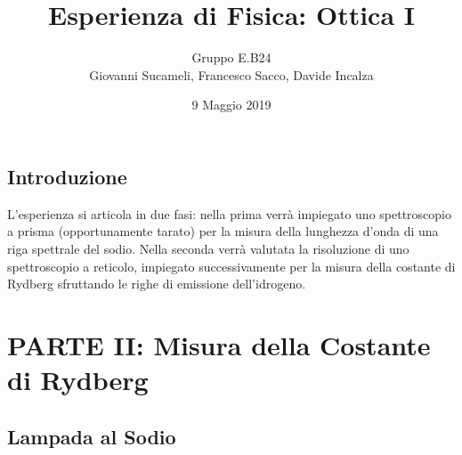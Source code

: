 \documentclass[10pt,a4paper]{article}
\author{Gruppo E.B24 \\ Giovanni Sucameli, Francesco Sacco, Davide Incalza}
\title{Esperienza di Fisica: Ottica I}
\begin{document}
	\date{9 Maggio 2019}
	\maketitle
    \begin{center}
		\subsection*{Introduzione}
		L'esperienza si articola in due fasi: nella prima verrà impiegato uno spettroscopio a prisma (opportunamente tarato) per la misura della lunghezza d'onda di una riga spettrale del sodio. Nella seconda verrà valutata la risoluzione di uno spettroscopio a reticolo, impiegato successivamente per la misura della costante di Rydberg sfruttando le righe di emissione dell'idrogeno.
	\end{center}


\section*{PARTE II: Misura della Costante di Rydberg}
	\subsection*{Lampada al Sodio}
		
\end{document}
